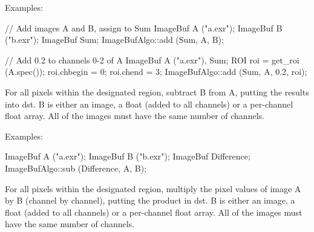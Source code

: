 \smallskip
\noindent Examples:
\begin{code}
    // Add images A and B, assign to Sum
    ImageBuf A ("a.exr");
    ImageBuf B ("b.exr");
    ImageBuf Sum;
    ImageBufAlgo::add (Sum, A, B);

    // Add 0.2 to channels 0-2 of A
    ImageBuf A ("a.exr"), Sum;
    ROI roi = get_roi (A.spec());
    roi.chbegin = 0;  roi.chend = 3;
    ImageBufAlgo::add (Sum, A, 0.2, roi);
\end{code}
\apiend



 

For all pixels within the designated region, subtract {\cf B} from {\cf A},
putting the results into {\cf dst}. {\cf B} is either an image, a float
(added to all channels) or a per-channel float array. All of the images must
have the same number of channels.

\smallskip
\noindent Examples:
\begin{code}
    ImageBuf A ("a.exr");
    ImageBuf B ("b.exr");
    ImageBuf Difference;
    ImageBufAlgo::sub (Difference, A, B);
\end{code}
\apiend



 

For all pixels within the designated region, multiply the pixel values
of image {\cf A} by {\cf B} (channel by channel), putting the product in
{\cf dst}.  {\cf B} is either an image,
a float (added to all channels) or a per-channel float array.
All of the images must have the same number of channels.


